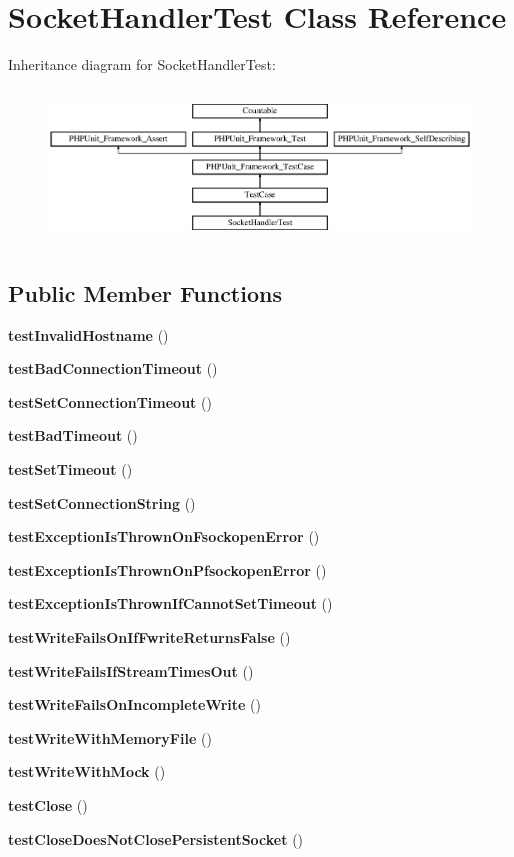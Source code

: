 \section{Socket\+Handler\+Test Class Reference}
\label{class_monolog_1_1_handler_1_1_socket_handler_test}
Inheritance diagram for Socket\+Handler\+Test\+:\begin{figure}[H]
\begin{center}
\leavevmode
\includegraphics[height=4.129793cm]{class_monolog_1_1_handler_1_1_socket_handler_test}
\end{center}
\end{figure}
\subsection*{Public Member Functions}
\begin{DoxyCompactItemize}
\item 
{\bf test\+Invalid\+Hostname} ()
\item 
{\bf test\+Bad\+Connection\+Timeout} ()
\item 
{\bf test\+Set\+Connection\+Timeout} ()
\item 
{\bf test\+Bad\+Timeout} ()
\item 
{\bf test\+Set\+Timeout} ()
\item 
{\bf test\+Set\+Connection\+String} ()
\item 
{\bf test\+Exception\+Is\+Thrown\+On\+Fsockopen\+Error} ()
\item 
{\bf test\+Exception\+Is\+Thrown\+On\+Pfsockopen\+Error} ()
\item 
{\bf test\+Exception\+Is\+Thrown\+If\+Cannot\+Set\+Timeout} ()
\item 
{\bf test\+Write\+Fails\+On\+If\+Fwrite\+Returns\+False} ()
\item 
{\bf test\+Write\+Fails\+If\+Stream\+Times\+Out} ()
\item 
{\bf test\+Write\+Fails\+On\+Incomplete\+Write} ()
\item 
{\bf test\+Write\+With\+Memory\+File} ()
\item 
{\bf test\+Write\+With\+Mock} ()
\item 
{\bf test\+Close} ()
\item 
{\bf test\+Close\+Does\+Not\+Close\+Persistent\+Socket} ()
\end{DoxyCompactItemize}
